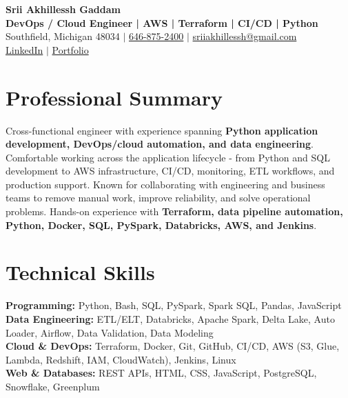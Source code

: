 \documentclass[letterpaper,10pt]{article}
\begin{document}
\fontsize{9.35pt}{10.45pt}\selectfont

\begin{center}
    {\LARGE \textbf{Srii Akhillessh Gaddam}} \\[-1pt]
    \textbf{DevOps / Cloud Engineer | AWS | Terraform | CI/CD | Python} \\[2pt]
    Southfield, Michigan 48034 $|$
    \href{tel:6468752400}{646-875-2400} $|$
    \href{mailto:sriiakhillessh@gmail.com}{sriiakhillessh@gmail.com} \\[1pt]
    \href{https://www.linkedin.com/in/srii-akhiilessh-gaddam-b48668191/}{LinkedIn} $|$
    \href{https://sriiakhillesshg.github.io/portfolio/}{Portfolio}
\end{center}
\vspace{-8pt}

\section{Professional Summary}
\small{Cross-functional engineer with experience spanning \textbf{Python application development, DevOps/cloud automation, and data engineering}. Comfortable working across the application lifecycle - from Python and SQL development to AWS infrastructure, CI/CD, monitoring, ETL workflows, and production support. Known for collaborating with engineering and business teams to remove manual work, improve reliability, and solve operational problems. Hands-on experience with \textbf{Terraform, data pipeline automation, Python, Docker, SQL, PySpark, Databricks, AWS, and Jenkins}.}

\section{Technical Skills}
\small{
\textbf{Programming:} Python, Bash, SQL, PySpark, Spark SQL, Pandas, JavaScript \\
\textbf{Data Engineering:} ETL/ELT, Databricks, Apache Spark, Delta Lake, Auto Loader, Airflow, Data Validation, Data Modeling \\
\textbf{Cloud \& DevOps:} Terraform, Docker, Git, GitHub, CI/CD, AWS (S3, Glue, Lambda, Redshift, IAM, CloudWatch), Jenkins, Linux \\
\textbf{Web \& Databases:} REST APIs, HTML, CSS, JavaScript, PostgreSQL, Snowflake, Greenplum
}
\end{document}
